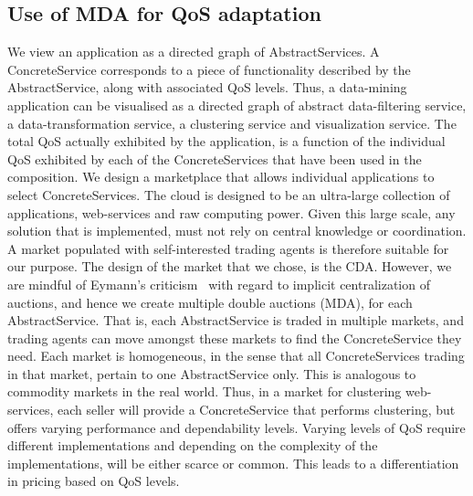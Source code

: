 \documentclass[10pt,journal,compsoc]{IEEEtran}
\begin{document}
\subsection{Use of MDA for QoS adaptation}
We view an application as a directed graph of AbstractServices. A ConcreteService corresponds to a piece of functionality described by the AbstractService, along with associated QoS levels. Thus, a data-mining application can be visualised as a directed graph of abstract data-filtering service, a data-transformation service, a clustering service and visualization service. The total QoS actually exhibited by the application, is a function of the individual QoS exhibited by each of the ConcreteServices that have been used in the composition. We design a marketplace that allows individual applications to select ConcreteServices. The cloud is designed to be an ultra-large collection of applications, web-services and raw computing power. Given this large scale, any solution that is implemented, must not rely on central knowledge or coordination. A market populated with self-interested trading agents is therefore suitable for our purpose. The design of the market that we chose, is the CDA.  However, we are mindful of Eymann's criticism~\cite{Eymann2003Decentralized} with regard to implicit centralization of auctions, and hence we create multiple double auctions (MDA), for each AbstractService. That is, each AbstractService is traded in multiple markets, and trading agents can move amongst these markets to find the ConcreteService they need. Each market is homogeneous, in the sense that all ConcreteServices trading in that market, pertain to one AbstractService only. This is analogous to commodity markets in the real world. Thus, in a market for clustering web-services, each seller will provide a ConcreteService that performs clustering, but offers varying performance and dependability levels. Varying levels of QoS require different implementations and depending on the complexity of the implementations, will be either scarce or common. This leads to a differentiation in pricing based on QoS levels.  
\end{document}
